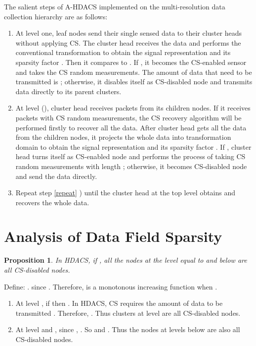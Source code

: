 \documentclass[conference]{IEEEtran}
\begin{document}
The salient steps of A-HDACS implemented on the multi-resolution data collection hierarchy are as follows:
\begin{enumerate}

\item At level one, leaf nodes send their single sensed data to their cluster heads without applying CS. 
The cluster head receives the data and performs the conventional transformation to 
obtain the signal representation and its sparsity factor . Then
it compares  to .
If , it becomes the CS-enabled sensor and takes the CS random 
measurements. The amount of data that need to be transmitted is ; otherwise, it disables itself as 
CS-disabled node and transmits  data directly to its parent clusters.

\item At level  (), cluster head receives packets from its children nodes. If 
it receives packets with CS random measurements, the CS recovery algorithm will 
be performed firstly to recover all the data.
After cluster head gets all the data from the children nodes, it projects the 
whole data into transformation domain to obtain the signal representation and its 
sparsity factor . If , 
cluster head turns itself as CS-enabled node and performs the process of taking 
CS random measurements with length ; 
otherwise, it becomes CS-disabled node and send the data directly. 
\label{repeat}

\item Repeat step \ref{repeat} ) until the cluster head at the top level  obtains 
and recovers the whole data.
\end{enumerate}

\section{Analysis of Data Field Sparsity}\label{ana_sparsity}
\newtheorem{prop}{Proposition}\label{prop1}
\begin{prop}
 In HDACS, if , all the nodes at the level equal to and below
  are all CS-disabled nodes. 
\end{prop}
\begin{IEEEproof}
  Define: . since . Therefore,  is a monotonous increasing function when .
  \begin{enumerate}
  \item At level , if  then . In HDACS, CS requires 
	the amount of data to be transmitted .
        Therefore, . Thus clusters at level  are all CS-disabled nodes.
  
  \item At level  and , since , 
  . So  and . Thus the nodes at levels below  are also all CS-disabled nodes.
  \end{enumerate}
\end{IEEEproof}
\end{document}
